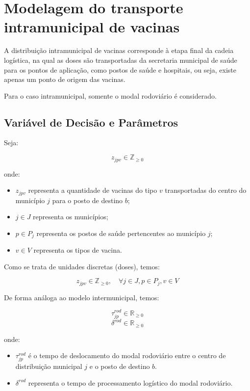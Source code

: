 \section{Modelagem do transporte intramunicipal de vacinas}

A distribuição intramunicipal de vacinas corresponde à etapa final da cadeia logística, na qual as doses são transportadas da secretaria municipal de saúde para os pontos de aplicação, como postos de saúde e hospitais, ou seja, existe apenas um ponto de origem das vacinas.

Para o caso intramunicipal, somente o modal rodoviário é considerado.

\subsection{Variável de Decisão e Parâmetros}

Seja:

\[
z_{jpv} \in \mathbb{Z}_{\geq 0}
\]

onde:
\begin{itemize}
    \item $z_{jpv}$ representa a quantidade de vacinas do tipo $v$ transportadas do centro do município $j$ para o posto de destino $b$;
    \item $j \in J$ representa os municípios;
    \item $p \in P_j$ representa os postos de saúde pertencentes ao município $j$;
    \item $v \in V$ representa os tipos de vacina.
\end{itemize}

Como se trata de unidades discretas (doses), temos:

\begin{equation*}
z_{jpv} \in \mathbb{Z}_{\geq 0}, \quad \forall j \in J, p \in P_j, v \in V
\end{equation*}

De forma análoga ao modelo intermunicipal, temos:

\[
\tau_{jp}^{rod} \in \mathbb{R}_{\geq 0}
\]
\[
\delta^{rod} \in \mathbb{R}_{\geq 0}
\]

onde:
\begin{itemize}
    \item $\tau_{jp}^{rod}$ é o tempo de deslocamento do modal rodoviário entre o centro de distribuição municipal $j$ e o posto de destino $b$.
    \item $\delta^{rod}$ representa o tempo de processamento logístico do modal rodoviário.
\end{itemize}

